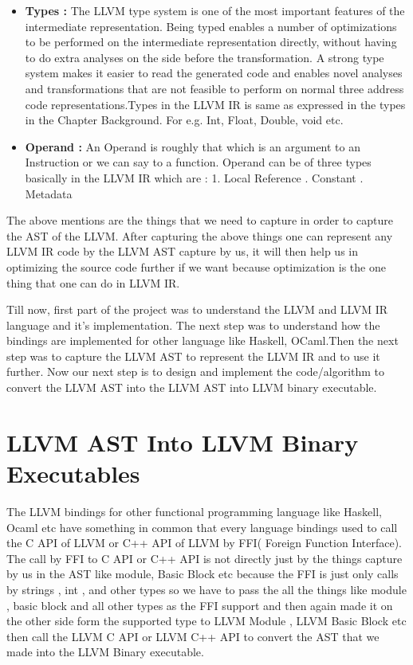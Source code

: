 \documentclass{book}
\begin{document}
\begin{itemize}
	\noindent\rule{12cm}{0.4pt} \newline
	
	\item \textbf{Types : } The LLVM type system is one of the most important features of the intermediate representation. Being typed enables a number of optimizations to be performed on the intermediate representation directly, without having to do extra analyses on the side before the transformation. A strong type system makes it easier to read the generated code and enables novel analyses and transformations that are not feasible to perform on normal three address code representations.Types in the LLVM IR is same as expressed in the types in the Chapter Background. For e.g. Int, Float, Double, void etc.
	\item \textbf{Operand : } An Operand is roughly that which is an argument to an Instruction or we can say to a function. Operand can be of three types basically in the LLVM IR which are :
	1. Local Reference . Constant . Metadata \newline
\end{itemize}
	
	
	The above mentions are the things that we need to capture in order to capture the AST of the LLVM. After capturing the above things one can represent any LLVM IR code by the LLVM AST capture by us, it will then help us in optimizing the source code further if we want because optimization is the one thing that one can do in LLVM IR.\newline
	
	Till now, first part of the project was to understand the LLVM and LLVM IR language and it's implementation. The next step was to understand how the bindings are implemented for other language like Haskell, OCaml.Then the next step was to capture the LLVM AST to represent the LLVM IR and to use it further. Now our next step is to design and implement the code/algorithm to convert the LLVM AST into the LLVM AST into LLVM binary executable.
	
\chapter{LLVM AST Into LLVM Binary Executables}
The LLVM bindings for other functional programming language like Haskell, Ocaml etc have something in common that every language bindings used to call the C API of LLVM or C++ API of LLVM by FFI( Foreign Function Interface). The call by FFI to C API or C++ API is not directly just by the things capture by us in the AST like module, Basic Block etc  because the FFI is just only calls by strings , int , and other types so we have to pass the all the things like module , basic block and all other types as the FFI support and then again made it on the other side form the supported type to LLVM Module , LLVM Basic Block etc then call the LLVM C API or LLVM C++ API to convert the AST that we made into the LLVM Binary executable.\newline \newline 
\end{document}
